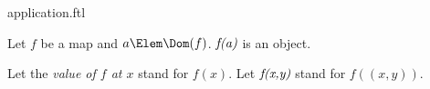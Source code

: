 \documentclass{stex}
\begin{document}
\begin{smodule}{application.ftl}



\begin{fakeforthel}
  \begin{signature}
    Let $f$ be a map and $a \Elem \Dom(f)$.
    $\emph{f(a)}$ is an object.
  \end{signature}
\end{fakeforthel}

\begin{forthel}
  \begin{convention}
    Let the \emph{value of $f$ at $x$} stand for $f(x)$.
    Let $\emph{f(x,y)}$ stand for $f((x,y))$.
  \end{convention}
\end{forthel}

\end{smodule}
\end{document}
